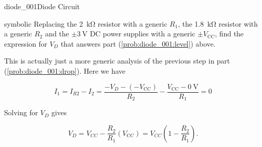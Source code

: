 \begin{mainquestion}{diode_001}{Diode Circuit}
\begin{partquestion}{symbolic}
{Replacing the \qty{2}{\kilo\ohm} resistor with a generic $R_1$, the \qty{1.8}{\kilo\ohm} resistor with a generic $R_2$ and the $\pm\qty{3}{\volt}$ DC power supplies with a generic $\pm V_{\text{CC}}$, find the expression for $V_D$ that answers part (\cref{prob:diode_001:level}) above.}
\begin{answer}
This is actually just a more generic analysis of the previous step in part (\cref{prob:diode_001:drop}). Here we have

\[
I_1
=
I_{R2}
-
I_2
=
\frac{-V_D-(-V_{\text{CC}})}{R_2}
-
\frac{V_{\text{CC}}-\qty{0}{\volt}}{R_1}
=
0
\]

Solving for $V_D$ gives

\[
V_D
=
V_{CC}
-
\frac{R_2}{R_1}\left(V_{\text{CC}}\right)
=
V_{CC}\left(1-\frac{R_2}{R_1}\right).
\]
\end{answer}
\end{partquestion}

\end{mainquestion}